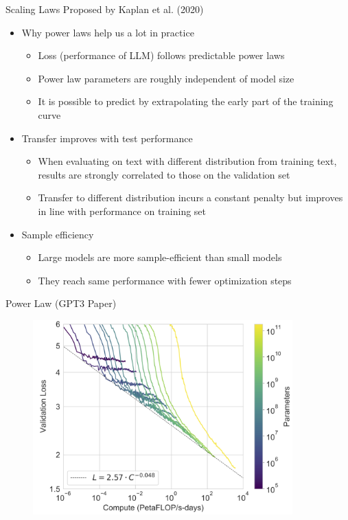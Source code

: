 \begin{vbframe}{Scaling Laws Proposed by Kaplan et al. (2020)}

\vfill

\begin{itemize}

	\item Why power laws help us a lot in practice
	\begin{itemize}
	\item Loss (performance of LLM) follows predictable power laws
	\item Power law parameters are roughly independent of model size
	\item It is possible to predict by extrapolating the early part of the training curve
	\end{itemize}

	\item Transfer improves with test performance
	\begin{itemize}
	\item When evaluating on text with different distribution from training text, results are strongly correlated to those on the validation set
	\item Transfer to different distribution incurs a constant penalty but improves in line with performance on training set
	\end{itemize}

	\item Sample efficiency
	\begin{itemize}
	\item Large models are more sample-efficient than small models
	\item They reach same performance with fewer optimization steps
	\end{itemize}

\end{itemize}

\vfill

\end{vbframe}


\begin{vbframe}{Power Law (GPT3 Paper)}

\begin{figure}
    \centering
    \includegraphics[width=10cm]{figure/losscompute.png}
\end{figure}
    
\end{vbframe}

